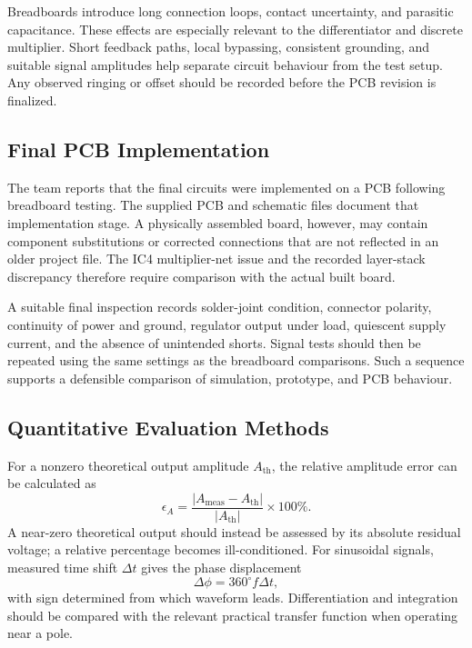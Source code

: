 \documentclass[11pt,a4paper]{article}
\begin{document}
Breadboards introduce long connection loops, contact uncertainty, and parasitic capacitance. These effects are especially relevant to the differentiator and discrete multiplier. Short feedback paths, local bypassing, consistent grounding, and suitable signal amplitudes help separate circuit behaviour from the test setup. Any observed ringing or offset should be recorded before the PCB revision is finalized.

\subsection{Final PCB Implementation}
The team reports that the final circuits were implemented on a PCB following breadboard testing. The supplied PCB and schematic files document that implementation stage. A physically assembled board, however, may contain component substitutions or corrected connections that are not reflected in an older project file. The IC4 multiplier-net issue and the recorded layer-stack discrepancy therefore require comparison with the actual built board.

A suitable final inspection records solder-joint condition, connector polarity, continuity of power and ground, regulator output under load, quiescent supply current, and the absence of unintended shorts. Signal tests should then be repeated using the same settings as the breadboard comparisons. Such a sequence supports a defensible comparison of simulation, prototype, and PCB behaviour.


\subsection{Quantitative Evaluation Methods}
For a nonzero theoretical output amplitude $A_{\mathrm{th}}$, the relative amplitude error can be calculated as
\begin{equation}
\epsilon_A=\frac{|A_{\mathrm{meas}}-A_{\mathrm{th}}|}{|A_{\mathrm{th}}|}\times100\%.
\end{equation}
A near-zero theoretical output should instead be assessed by its absolute residual voltage; a relative percentage becomes ill-conditioned. For sinusoidal signals, measured time shift $\Delta t$ gives the phase displacement
\begin{equation}
\Delta\phi=360^\circ f\Delta t,
\end{equation}
with sign determined from which waveform leads. Differentiation and integration should be compared with the relevant practical transfer function when operating near a pole.
\end{document}
